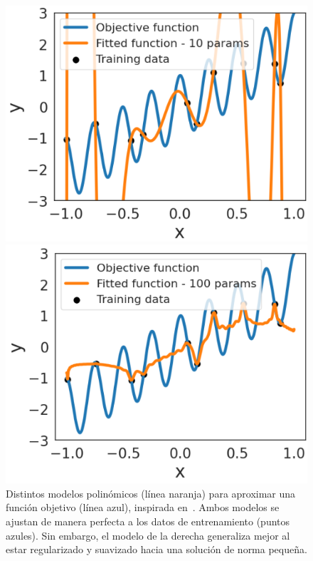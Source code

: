 \begin{figure}[h!]
    \centering
    \begin{minipage}{0.45\textwidth}
        \centering
        \includegraphics[width=\linewidth]{img/experiments/legendre1.2.png}
    \end{minipage}
    \hfill
    \begin{minipage}{0.45\textwidth}
        \centering
        \includegraphics[width=\linewidth]{img/experiments/legendre1.3.png}
    \end{minipage}
    \caption[Distintos modelos polinómicos para aproximar una función, inspirada en~\cite{Schaeffer2023}.]{Distintos modelos polinómicos (línea naranja) para aproximar una función objetivo (línea azul), inspirada en~\cite{Schaeffer2023}. Ambos modelos se ajustan de manera perfecta a los datos de entrenamiento (puntos azules). Sin embargo, el modelo de la derecha generaliza mejor al estar regularizado y suavizado hacia una solución de norma pequeña.}\label{fig:suavidad1}
\end{figure}

